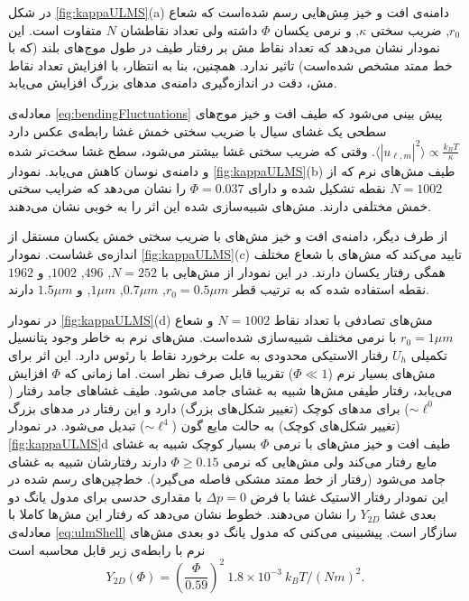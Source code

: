 در شکل
\ref{fig:kappaULMS}(a)
دامنه‌ی افت و خیز مِش‌هایی رسم شده‌است که شعاع
$r_0$,
ضریب سختی
$\kappa$,
 و نرمی یکسان
 $\Phi$
  داشته ولی تعداد نقاطشان
$N$
متفاوت است. این نمودار نشان می‌دهد که تعداد نقاط مش بر رفتار طیف در طول موج‌های بلند (که با خط ممتد مشخص شده‌است) تاثیر ندارد. همچنین، بنا به انتظار، با افزایش تعداد نقاط مش، دقت در اندازه‌گیری دامنه‌ی مد‌های بزرگ افزایش می‌یابد.

معادله‌ی 
\ref{eq:bendingFluctuations}
پیش بینی می‌شود که طیف افت و خیز موج‌های سطحی یک غشای سیال با ضریب سختی خمش غشا رابطه‌ی عکس دارد
$\langle|u_{\ell,m}|^2\rangle\propto \frac{k_BT}{\kappa}$.
 وقتی که ضریب سختی غشا بیشتر می‌شود، سطح غشا سخت‌تر شده و دامنه‌ی نوسان کاهش می‌یابد.  نمودار
\ref{fig:kappaULMS}(b)
 طیف مش‌های نرم که از 
$N=1002$ 
نقطه تشکیل شده و دارای
$\Phi=0.037$ 
را نشان می‌دهد که ضرایب سختی خمش مختلفی دارند. مش‌های شبیه‌سازی شده این اثر را به خوبی نشان می‌دهند. 

از طرف دیگر، دامنه‌ی افت و خیز مش‌های با ضریب سختی خمش یکسان مستقل از اندازه‌ی غشاست. نمودار 
\ref{fig:kappaULMS}(c)
تایید می‌کند که مش‌های با شعاع مختلف همگی رفتار یکسان دارند. در این نمودار از مش‌هایی با 
$N=252$, $496$, $1002$, 
 و
$1962$
نقطه استفاده شده که به ترتیب قطر
 $r_0=0.5\mu m$, $0.7\mu m$, $1\mu m$,
 و 
$1.5 \mu m$
دارند.


در نمودار
\ref{fig:kappaULMS}(d)
مش‌های تصادفی با تعداد نقاط
$N=1002$
و شعاع
$r_0=1 \mu m$
با نرمی مختلف شبیه‌سازی شده‌است. مش‌های نرم به خاطر وجود پتانسیل تکمیلی
$U_h$
رفتار الاستیکی محدودی به علت برخورد نقاط با رئوس دارد. این اثر برای مش‌های بسیار نرم
 ($\Phi\ll1$)
تقریبا قابل صرف نظر است. اما زمانی که 
$\Phi$
افزایش می‌یابد، رفتار طیفی‌ مش‌ها شبیه به غشای جامد می‌شود. طیف غشاهای جامد رفتار
($\sim\ell^0$)
برای مدهای کوچک (تغییر شکل‌های بزرگ) دارد و این رفتار در مد‌های بزرگ (تغییر شکل‌های کوچک) به حالت مایع گون
($\sim\ell^4$)
تبدیل می‌شود. در نمودار
\ref{fig:kappaULMS}d
طیف افت و خیز مش‌های با نرمی 
$\Phi$
بسیار کوچک شبیه به غشای مایع رفتار می‌کند ولی مش‌هایی که نرمی 
$\Phi\geq0.15$
دارند رفتارشان شبیه به غشای جامد می‌شود (رفتار از خط ممتد مشکی فاصله می‌گیرد). خط‌چین‌های رسم شده در این نمودار رفتار الاستیک غشا با فرض 
$\Delta p=0$
با مقداری حدسی برای مدول یانگ دو بعدی غشا
$Y_{2D}$
را نشان می‌دهند. خطوط نشان می‌دهد که رفتار این مش‌ها کاملا با معادله‌ی
\ref{eq:ulmShell}
سازگار است. پیشبینی می‌کنی که مدول یانگ دو بعدی مش‌‌های نرم با رابطه‌ی زیر قابل محاسبه است
\begin{equation}
Y_{2D}(\Phi)= \left(\frac{\Phi}{0.59}\right)^2~1.8\times 10^{-3}~k_BT/(Nm)^2.
\label{eq:YoungPhi}
\end{equation}

